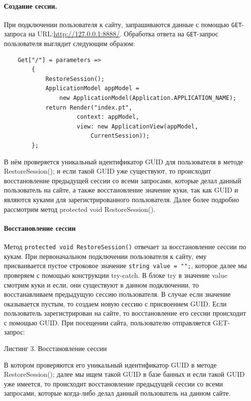 \documentclass[a4paper,14pt,openany,final]{extreport} %
\def\oldcaption{} \let\oldcaption=\caption
\def\caption{\stepcounter{captionsnum}\oldcaption}
\begin{document}
{\paragraph{Создание сессии.}
При подключении пользователя к сайту, запрашиваются данные с помощью \verb|GET|-запроса на URL:\url{http://127.0.0.1:8888/}. Обработка ответа на \verb|GET|-запрос пользователя выглядит следующим образом:
\begin{pzlisting}
\caption{Создание сессии}
\begin{verbatim}
    Get["/"] = parameters =>
        {
            RestoreSession();
            ApplicationModel appModel =
                new ApplicationModel(Application.APPLICATION_NAME);
            return Render("index.pt",
                     context: appModel,
                     view: new ApplicationView(appModel,
                         CurrentSession));
        };
\end{verbatim}
\end{pzlisting}
В нём проверяется уникальный идентификатор GUID для пользователя в методе RestoreSession(); и если такой GUID уже существуют, то происходит восстановление предыдущей сессии со всеми запросами, которые делал данный пользователь на сайте, а также восстановление значение куки, так как GUID и являются куками для зарегистрированного пользователя. Далее более подробно рассмотрим метод protected void RestoreSession().

\paragraph{Восстановление сессии}
Метод \verb|protected void RestoreSession()| отвечает за восстановление сессии по кукам. При первоначальном подключении пользователя к сайту, ему присваивается пустое строковое значение \verb|string value = "";|, которое далее мы проверяем с помощью конструкции try-catch. В блоке try в значение value смотрим куки и если, они существуют в данном подключении, то восстанавливаем предыдущую сессию пользователя. В случае если значение оказывается пустым, то создаем новую сессию с присвоением GUID. Если пользователь зарегистрирован на сайте, то восстановление его сессии происходит с помощью GUID. При посещении сайта, пользователю отправляется GET- запрос:

Листинг 3. Восстановление сессии


В котором проверяются его уникальный идентификатор GUID в методе RestoreSession(); далее мы ищем такой GUID в  базе банных и если такой GUID уже имеется, то происходит восстановление предыдущей сессии со всеми запросами, которые когда-либо делал данный пользователь на данном сайте.

}
\end{document}
